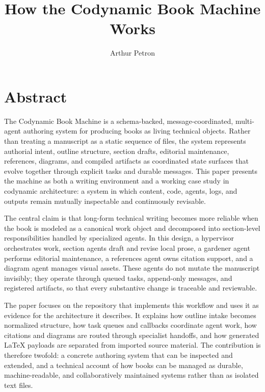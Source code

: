 \documentclass[11pt]{article}
\title{How the Codynamic Book Machine Works}
\author{Arthur Petron}
\begin{document}
\section*{Abstract}

The Codynamic Book Machine is a schema-backed, message-coordinated, multi-agent authoring system for producing books as living technical objects. Rather than treating a manuscript as a static sequence of files, the system represents authorial intent, outline structure, section drafts, editorial maintenance, references, diagrams, and compiled artifacts as coordinated state surfaces that evolve together through explicit tasks and durable messages. This paper presents the machine as both a writing environment and a working case study in codynamic architecture: a system in which content, code, agents, logs, and outputs remain mutually inspectable and continuously revisable.

The central claim is that long-form technical writing becomes more reliable when the book is modeled as a canonical work object and decomposed into section-level responsibilities handled by specialized agents. In this design, a hypervisor orchestrates work, section agents draft and revise local prose, a gardener agent performs editorial maintenance, a references agent owns citation support, and a diagram agent manages visual assets. These agents do not mutate the manuscript invisibly; they operate through queued tasks, append-only messages, and registered artifacts, so that every substantive change is traceable and reviewable.

The paper focuses on the repository that implements this workflow and uses it as evidence for the architecture it describes. It explains how outline intake becomes normalized structure, how task queues and callbacks coordinate agent work, how citations and diagrams are routed through specialist handoffs, and how generated \LaTeX{} payloads are separated from imported source material. The contribution is therefore twofold: a concrete authoring system that can be inspected and extended, and a technical account of how books can be managed as durable, machine-readable, and collaboratively maintained systems rather than as isolated text files.
\end{document}

